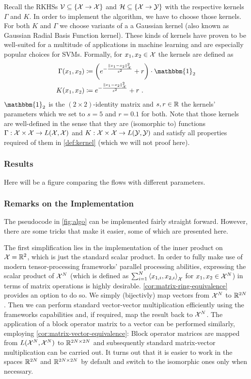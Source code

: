Recall the RKHSs $\mathcal{V} \subseteq \{\mathcal{X} \rightarrow \mathcal{X}\}$ and $\mathcal{H} \subseteq \{\mathcal{X} \rightarrow \mathcal{Y}\}$ with the respective kernels $\Gamma$ and $K$.
In order to implement the algorithm, we have to choose those kernels.
For both $K$ and $\Gamma$ we choose variants of a a Gaussian kernel (also known as Gaussian Radial Basis Function kernel).
These kinds of kernels have proven to be well-suited for a multitude of applications in machine learning and are especially popular choices for SVMs. 
Formally, for $x_1, x_2 \in \mathcal{X}$ the kernels are defined as
\begin{align}
	\Gamma(x_1, x_2) &\coloneqq \left(e^{-\frac{\norm{x_1 - x_2}_\cX^2}{s^2}} + r\right) \cdot \mathbbm{1}_2\\
	K(x_1, x_2) &\coloneqq e^{-\frac{\norm{x_1 - x_2}_\cX^2}{s^2}} + r \ .
\end{align}
$\mathbbm{1}_2$ is the $(2\times2)$-identity matrix and $s, r \in \mathbb{R}$ the kernels' parameters which we set to $s = 5$ and $r = 0.1$ for both.
Note that those kernels are well-defined in the sense that they are (isomorphic to) functions $\Gamma: \mathcal{X} \times \mathcal{X} \rightarrow L(\mathcal{X}, \mathcal{X})$ and $K: \mathcal{X} \times \mathcal{X} \rightarrow L(\mathcal{Y}, \mathcal{Y})$ and satisfy all properties required of them in \cref{def:kernel} (which we will not proof here).


\subsubsection{Results}

Here will be a figure comparing the flows with different parameters.

\subsubsection{Remarks on the Implementation}

The pseudocode in \cref{fig:algo} can be implemented fairly straight forward.
However, there are some tricks that make it easier, some of which are presented here.

The first simplification lies in the implementation of the inner product on $\mathcal{X} = \mathbb{R}^2$, which is just the standard scalar product.
In order to fully make use of modern tensor-processing frameworks' parallel processing abilities, expressing the scalar product of $\mathcal{X}^N$ (which is defined as $\sum_{i=1}^N \left<x_{1, i}, x_{2, i}\right>_{\mathcal{X}}$ for $x_1, x_2 \in \mathcal{X}^N$) in terms of matrix operations is highly desirable.
\cref{cor:matrix-ring-equivalence} provides an option to do so.
We simply (bijectivly) map vectors from $\mathcal{X}^N$ to $\mathbb{R}^{2N}$.
Then we can perform standard vector-vector multiplication efficiently using the frameworks capabilities and, if required, map the result back to $\mathcal{X}^N$.
The application of a block operator matrix to a vector can be performed similarly, employing \cref{cor:matrix-vector-equivalence}:
Block operator matrices are mapped from $L(\mathcal{X}^N, \mathcal{X}^N)$ to $\mathbb{R}^{2N \times 2N}$ and subsequently standard matrix-vector multiplication can be carried out.
It turns out that it is easier to work in the spaces $\mathbb{R}^{2N}$ and $\mathbb{R}^{2N \times 2N}$ by default and switch to the isomorphic ones only when necessary.

